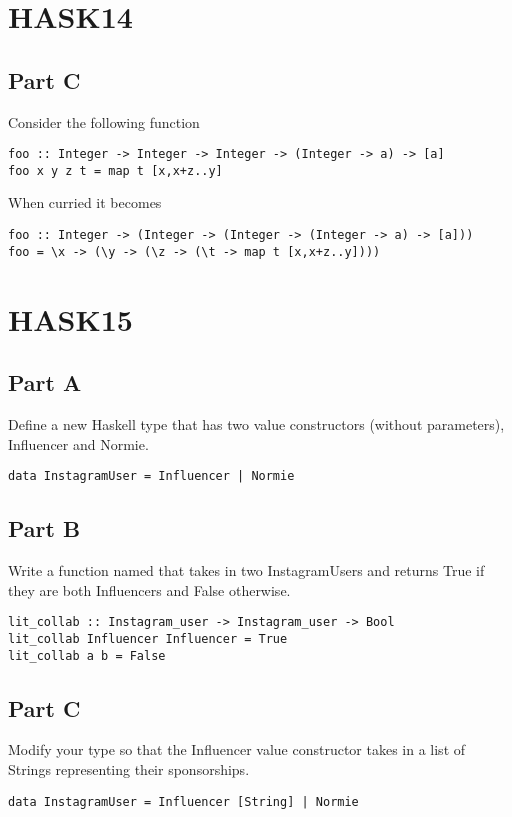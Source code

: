\section*{HASK14}
\subsection*{Part C}
Consider the following function
\begin{verbatim}
foo :: Integer -> Integer -> Integer -> (Integer -> a) -> [a]
foo x y z t = map t [x,x+z..y]
\end{verbatim}
When curried it becomes
\begin{verbatim}
foo :: Integer -> (Integer -> (Integer -> (Integer -> a) -> [a]))
foo = \x -> (\y -> (\z -> (\t -> map t [x,x+z..y])))
\end{verbatim}

\section*{HASK15}
\subsection*{Part A}
Define a new Haskell type  that has two value
constructors (without parameters), Influencer and Normie.
\begin{verbatim}
data InstagramUser = Influencer | Normie
\end{verbatim}

\subsection*{Part B}
Write a function named  that takes in two
InstagramUsers and returns True if they are both Influencers and False
otherwise.
\begin{verbatim}
lit_collab :: Instagram_user -> Instagram_user -> Bool
lit_collab Influencer Influencer = True
lit_collab a b = False
\end{verbatim}

\subsection*{Part C}
Modify your  type so that the Influencer value
constructor takes in a list of Strings representing their sponsorships.
\begin{verbatim}
data InstagramUser = Influencer [String] | Normie
\end{verbatim}

